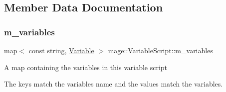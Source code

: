 \subsection{Member Data Documentation}
\hypertarget{classmage_1_1_variable_script_aec3791e021e66904862f91e65f0389c4}{}\label{classmage_1_1_variable_script_aec3791e021e66904862f91e65f0389c4} 
\subsubsection{\texorpdfstring{m\+\_\+variables}{m\_variables}}
{\footnotesize\ttfamily map$<$ const string, \hyperlink{structmage_1_1_variable}{Variable} $>$ mage\+::\+Variable\+Script\+::m\+\_\+variables\hspace{0.3cm}{\ttfamily [private]}}

A map containing the variables in this variable script

The keys match the variables\textquotesingle{} name and the values match the variables. 